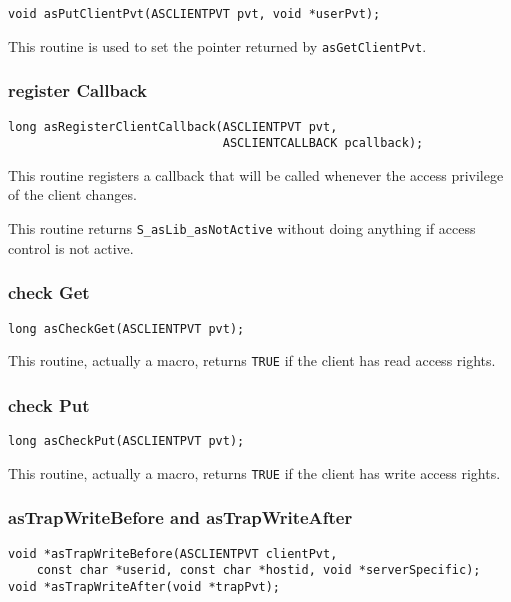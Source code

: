 \begin{verbatim}
void asPutClientPvt(ASCLIENTPVT pvt, void *userPvt); 
\end{verbatim}

This routine is used to set the pointer returned by \verb|asGetClientPvt|.

\subsubsection{register Callback}

\begin{verbatim}
long asRegisterClientCallback(ASCLIENTPVT pvt,
                              ASCLIENTCALLBACK pcallback);
\end{verbatim}

This routine registers a callback that will be called whenever the access privilege of the client changes.

This routine returns \verb|S_asLib_asNotActive| without doing anything if access control is not active.

\subsubsection{check Get}

\begin{verbatim}
long asCheckGet(ASCLIENTPVT pvt); 
\end{verbatim}

This routine, actually a macro, returns \verb|TRUE| if the client has read access rights.

\subsubsection{check Put}

\begin{verbatim}
long asCheckPut(ASCLIENTPVT pvt);
\end{verbatim}

This routine, actually a macro, returns \verb|TRUE| if the client has write access rights.

\subsubsection{asTrapWriteBefore and asTrapWriteAfter}

\begin{verbatim}
void *asTrapWriteBefore(ASCLIENTPVT clientPvt,
    const char *userid, const char *hostid, void *serverSpecific);
void *asTrapWriteAfter(void *trapPvt);
\end{verbatim}


